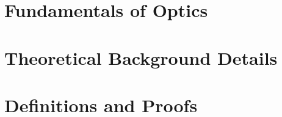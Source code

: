 \documentclass[mestrado, pre-defesa]{packages/icmc}
\begin{document}
% 

\postextual



\begin{apendicesenv}
    \chapter{Fundamentals of Optics}
    \label{chapter:fundamentals-of-optics}
    
    
    \chapter{Theoretical Background Details}
    \label{chapter:theoretical-background-details}
    
    
    \chapter{Definitions and Proofs}
    \label{chapter:definitions-and-proofs}
    
\end{apendicesenv}
\end{document}
